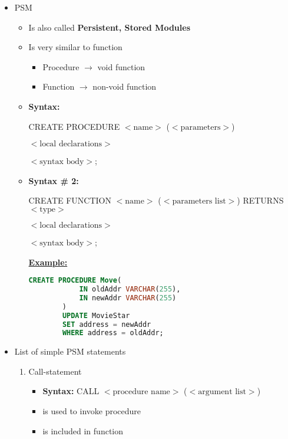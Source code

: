 \documentclass[12pt]{article}
\begin{document}
\begin{enumerate}[1.]
\begin{enumerate}[a)]
        \begin{itemize}
            \item PSM
            \begin{itemize}
                \item Is also called \textbf{Persistent, Stored Modules}
                \item Is very similar to function
                \begin{itemize}
                    \item Procedure $\to$ void function
                    \item Function $\to$ non-void function
                \end{itemize}
                \item \textbf{Syntax:}

                \bigskip

                CREATE PROCEDURE $<\text{name}>$ ($<\text{parameters}>$)

                    $<\text{local declarations}>$

                    $<\text{syntax body}>$;

                \item \textbf{Syntax \# 2:}

                \bigskip

                CREATE FUNCTION $<\text{name}>$ ($<\text{parameters list}>$) RETURNS $<\text{type}>$

                    $<\text{local declarations}>$

                    $<\text{syntax body}>$;

                \bigskip

                \underline{\textbf{Example:}}

                \bigskip

        \begin{lstlisting}[language=SQL]
        CREATE PROCEDURE Move(
            IN oldAddr VARCHAR(255),
            IN newAddr VARCHAR(255)
        )
        UPDATE MovieStar
        SET address = newAddr
        WHERE address = oldAddr;
        \end{lstlisting}

            \end{itemize}

            \item List of simple PSM statements
            \begin{enumerate}[1.]
                \item Call-statement
                \begin{itemize}
                    \item \textbf{Syntax:} CALL $<\text{procedure name}>$ ($<\text{argument list}>$)
                    \item is used to invoke procedure
                    \item is included in function


\end{itemize}
\end{enumerate}
\end{itemize}
\end{enumerate}
\end{enumerate}
\end{document}
